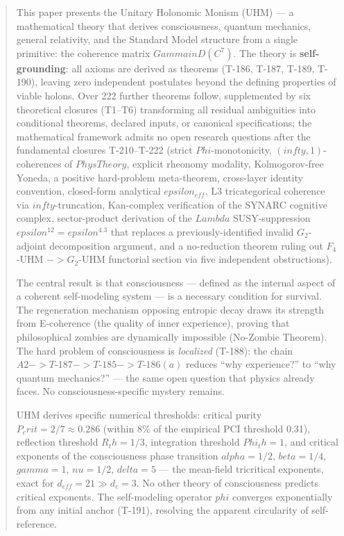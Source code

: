 \documentclass[10pt,letterpaper]{article}
\theoremstyle{uhm}
\newcommand{\Gam}{\ensuremath{\Gamma}}                       %
\newcommand{\Dens}{\ensuremath{\mathcal{D}}}                 %
\newcommand{\Pcrit}{\ensuremath{P_{\mathrm{crit}}}}          %
\newcommand{\Rth}{\ensuremath{R_{\mathrm{th}}}}              %
\newcommand{\Phith}{\ensuremath{\Phi_{\mathrm{th}}}}         %
\newcommand{\vp}{\ensuremath{\varphi}}                       %
\def\Gam{Gamma}%
\def\Dens{D}%
\def\Pcrit{P_crit}%
\def\Rth{R_th}%
\def\Phith{Phi_th}%
\def\vp{phi}%
\def\mathrm#1{#1}%
\def\mathbb#1{#1}%
\def\mathcal#1{#1}%
\def\mathbf#1{#1}%
\def\infty{infty}%
\def\in{in}%
\def\to{->}%
\def\cdot{.}%
\def\varphi{phi}%
\def\alpha{alpha}%
\def\beta{beta}%
\def\gamma{gamma}%
\def\delta{delta}%
\def\nu{nu}%
\def\Phi{Phi}%
\def\Lambda{Lambda}%
\def\varepsilon{epsilon}%
\begin{document}
\begin{abstract}
This paper presents the Unitary Holonomic Monism (UHM) --- a mathematical
theory that derives consciousness, quantum mechanics, general relativity, and
the Standard Model structure from a single primitive: the coherence matrix
$\Gam \in \Dens(\mathbb{C}^7)$. The theory is \textbf{self-grounding}: all
axioms are derived as theorems (T-186, T-187, T-189, T-190), leaving zero
independent postulates beyond the defining properties of viable holons.
Over 222 further theorems follow, supplemented by six theoretical
closures (T1--T6) transforming all residual ambiguities into conditional
theorems, declared inputs, or canonical specifications; the mathematical
framework admits no open research questions after the fundamental
closures T-210--T-222 (strict
$\Phi$-monotonicity, $(\infty,1)$-coherences of $\mathbf{PhysTheory}$,
explicit rheonomy modality, Kolmogorov-free Yoneda, a positive
hard-problem meta-theorem, cross-layer identity convention,
closed-form analytical $\varepsilon_{\mathrm{eff}}$, L3 tricategorical
coherence via $\infty$-truncation, Kan-complex verification of the
SYNARC cognitive complex, sector-product derivation of the
$\Lambda$ SUSY-suppression $\varepsilon^{12} = \varepsilon^{4 \cdot 3}$
that replaces a previously-identified invalid $G_2$-adjoint
decomposition argument, and a no-reduction theorem ruling out
$F_4$-UHM $\to G_2$-UHM functorial section via five independent
obstructions).

The central result is that consciousness --- defined as the internal aspect of a
coherent self-modeling system --- is a necessary condition for survival. The regeneration
mechanism opposing entropic decay draws its strength from E-coherence (the quality of
inner experience), proving that philosophical zombies are dynamically impossible
(No-Zombie Theorem). The hard problem of consciousness is \emph{localized}
(T-188): the chain $A2 \to T\text{-}187 \to T\text{-}185 \to T\text{-}186(a)$
reduces ``why experience?'' to ``why quantum mechanics?'' --- the same open
question that physics already faces. No consciousness-specific mystery remains.

UHM derives specific numerical thresholds: critical purity $\Pcrit = 2/7 \approx 0.286$
(within 8\% of the empirical PCI threshold 0.31), reflection threshold $\Rth = 1/3$,
integration threshold $\Phith = 1$, and critical exponents of the consciousness phase
transition $\alpha = 1/2$, $\beta = 1/4$, $\gamma = 1$, $\nu = 1/2$, $\delta = 5$
--- the mean-field tricritical exponents, exact for $d_{\mathrm{eff}} = 21 \gg d_c = 3$.
No other theory of consciousness predicts critical exponents. The self-modeling
operator $\vp$ converges exponentially from any initial anchor (T-191), resolving
the apparent circularity of self-reference.


\end{abstract}
\end{document}
